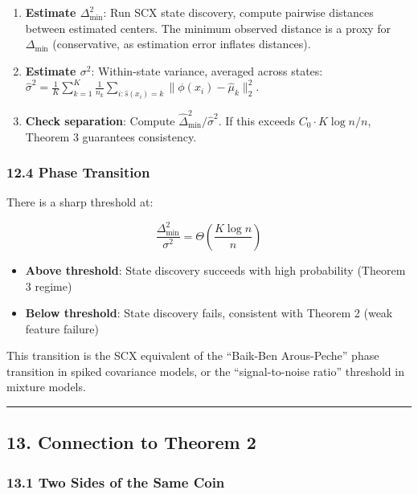 \documentclass[
  12pt,
]{article}
\providecommand{\tightlist}{%
  \setlength{\itemsep}{0pt}\setlength{\parskip}{0pt}}
\begin{document}
\begin{enumerate}
\def\labelenumi{\arabic{enumi}.}
\item
  \textbf{Estimate \(\Delta_{\min}^2\)}: Run SCX state discovery,
  compute pairwise distances between estimated centers. The minimum
  observed distance is a proxy for \(\Delta_{\min}\) (conservative, as
  estimation error inflates distances).
\item
  \textbf{Estimate \(\sigma^2\)}: Within-state variance, averaged across
  states:
  \(\hat{\sigma}^2 = \frac{1}{K} \sum_{k=1}^K \frac{1}{n_k} \sum_{i: \hat{s}(x_i)=k} \|\phi(x_i) - \hat{\mu}_k\|_2^2\).
\item
  \textbf{Check separation}: Compute
  \(\hat{\Delta}_{\min}^2 / \hat{\sigma}^2\). If this exceeds
  \(C_0 \cdot K \log n / n\), Theorem 3 guarantees consistency.
\end{enumerate}

\subsubsection{12.4 Phase Transition}\label{phase-transition}

There is a sharp threshold at:

\[\frac{\Delta_{\min}^2}{\sigma^2} = \Theta\left(\frac{K \log n}{n}\right)\]

\begin{itemize}
\tightlist
\item
  \textbf{Above threshold}: State discovery succeeds with high
  probability (Theorem 3 regime)
\item
  \textbf{Below threshold}: State discovery fails, consistent with
  Theorem 2 (weak feature failure)
\end{itemize}

This transition is the SCX equivalent of the ``Baik-Ben Arous-Peche''
phase transition in spiked covariance models, or the ``signal-to-noise
ratio'' threshold in mixture models.

\begin{center}\rule{0.5\linewidth}{0.5pt}\end{center}

\subsection{13. Connection to Theorem 2}\label{connection-to-theorem-2}

\subsubsection{13.1 Two Sides of the Same
Coin}\label{two-sides-of-the-same-coin}
\end{document}
